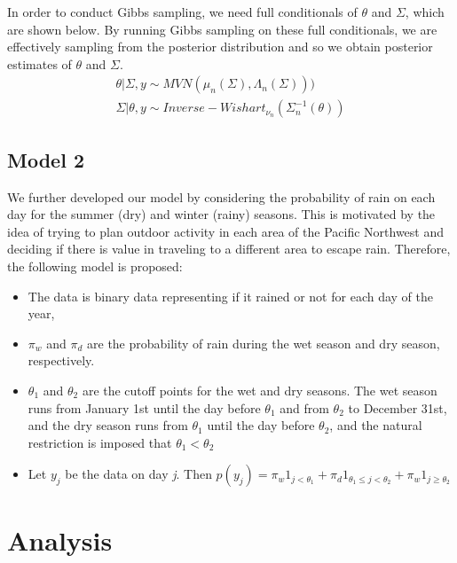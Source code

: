 \documentclass{article}
\begin{document}
In order to conduct Gibbs sampling, we need full conditionals of $\theta$ and $\Sigma$, which are shown below.  By running Gibbs sampling on these full conditionals, we are effectively sampling from the posterior distribution and so we obtain posterior estimates of $\theta$ and $\Sigma$. 
\begin{align*}
\theta | \Sigma, y \sim MVN(\mu_n(\Sigma), \Lambda_n(\Sigma)))  \\
\Sigma | \theta, y \sim Inverse - Wishart_{\nu_n} (\Sigma_n^{-1}(\theta))
\end{align*}



\subsection{Model 2}

We further developed our model by considering the probability of rain on each day for the summer (dry) and winter (rainy) seasons. This is motivated by the idea of trying to plan outdoor activity in each area of the Pacific Northwest and deciding if there is value in traveling to a different area to escape rain.
Therefore, the following model is proposed:
\begin{itemize}
\item The data is binary data representing if it rained or not for each day of the year,
\item $\pi_w$ and $\pi_d$ are the probability of rain during the wet season and dry season, respectively.
\item $\theta_1$ and $\theta_2$ are the cutoff points for the wet and dry seasons. The wet season runs from January 1st until the day before $\theta_1$ and from $\theta_2$ to December 31st, and the dry season runs from $\theta_1$ until the day before $\theta_2$, and the natural restriction is imposed that $\theta_1 < \theta_2$
\item Let $y_j$ be the data on day \textit{j}. Then $p(y_j) = \pi_w  1_{j < \theta_1} + \pi_d  1_{\theta_1\leq j < \theta_2} +\pi_w  1_{j \geq \theta_2} $
\end{itemize}

\section{Analysis}
\end{document}
